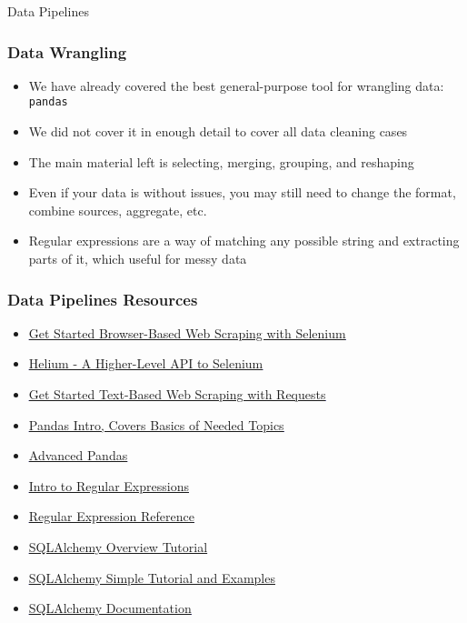 \documentclass[handout, 11pt]{beamer}
\begin{document}
\begin{section}{Data Pipelines}
\begin{frame}
\frametitle{Data Wrangling}
\begin{itemize}
\small
\vfill
\item We have already covered the best general-purpose tool for wrangling data:
\texttt{pandas}
\vfill
\item We did not cover it in enough detail to cover all data cleaning cases
\vfill
\item The main material left is selecting, merging, grouping, and reshaping
\vfill
\item Even if your data is without issues, you may still need to change the format, combine sources, aggregate, etc.
\vfill
\item Regular expressions are a way of matching any possible string and extracting parts of it, which useful for messy data
\end{itemize}
\end{frame}
\begin{frame}
\frametitle{Data Pipelines Resources}
\begin{itemize}
\item \textcolor{blue}{\underline{\href{https://stackabuse.com/getting-started-with-selenium-and-python/}{Get Started Browser-Based Web Scraping with Selenium}}}
\vfill
\item \textcolor{blue}{\underline{\href{https://github.com/mherrmann/selenium-python-helium}{Helium - A Higher-Level API to Selenium}}}
\vfill
\item \textcolor{blue}{\underline{\href{https://realpython.com/python-requests/}{Get Started Text-Based Web Scraping with Requests}}}
\vfill
\item \textcolor{blue}{\underline{\href{https://pandas.pydata.org/pandas-docs/stable/getting\_started/10min.html}{Pandas Intro, Covers Basics of Needed Topics}}}
\vfill
\item \textcolor{blue}{\underline{\href{https://pandas.pydata.org/pandas-docs/stable/user\_guide/cookbook.html\#cookbook}{Advanced Pandas}}}
\vfill
\item \textcolor{blue}{\underline{\href{https://scotch.io/tutorials/an-introduction-to-regex-in-python}{Intro to Regular Expressions}}}
\vfill
\item \textcolor{blue}{\underline{\href{https://docs.python.org/3/library/re.html}{Regular Expression Reference}}}
\vfill
\item \textcolor{blue}{\underline{\href{https://auth0.com/blog/sqlalchemy-orm-tutorial-for-python-developers/}{SQLAlchemy Overview Tutorial}}}
\vfill
\item \textcolor{blue}{\underline{\href{https://towardsdatascience.com/sqlalchemy-python-tutorial-79a577141a91}{SQLAlchemy Simple Tutorial and Examples}}}
\vfill
\item \textcolor{blue}{\underline{\href{https://docs.sqlalchemy.org/en/13/intro.html}{SQLAlchemy Documentation}}}
\end{itemize}
\end{frame}
\end{section}
\end{document}
